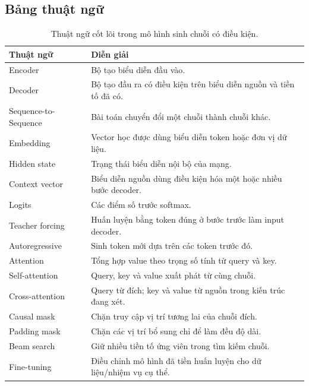 \documentclass[11pt,a4paper]{article}
\numberwithin{equation}{section}
\begin{document}
\subsection{Bảng thuật ngữ}
\begin{table}[H]
\centering\small
\begin{tabularx}{\linewidth}{@{}p{4.2cm}Y@{}}
\toprule{}Thuật ngữ & Diễn giải\\\midrule
Encoder & Bộ tạo biểu diễn đầu vào.\\
Decoder & Bộ tạo đầu ra có điều kiện trên biểu diễn nguồn và tiền tố đã có.\\
Sequence-to-Sequence & Bài toán chuyển đổi một chuỗi thành chuỗi khác.\\
Embedding & Vector học được dùng biểu diễn token hoặc đơn vị dữ liệu.\\
Hidden state & Trạng thái biểu diễn nội bộ của mạng.\\
Context vector & Biểu diễn nguồn dùng điều kiện hóa một hoặc nhiều bước decoder.\\
Logits & Các điểm số trước softmax.\\
Teacher forcing & Huấn luyện bằng token đúng ở bước trước làm input decoder.\\
Autoregressive & Sinh token mới dựa trên các token trước đó.\\
Attention & Tổng hợp value theo trọng số tính từ query và key.\\
Self-attention & Query, key và value xuất phát từ cùng chuỗi.\\
Cross-attention & Query từ đích; key và value từ nguồn trong kiến trúc đang xét.\\
Causal mask & Chặn truy cập vị trí tương lai của chuỗi đích.\\
Padding mask & Chặn các vị trí bổ sung chỉ để làm đều độ dài.\\
Beam search & Giữ nhiều tiền tố ứng viên trong tìm kiếm chuỗi.\\
Fine-tuning & Điều chỉnh mô hình đã tiền huấn luyện cho dữ liệu/nhiệm vụ cụ thể.\\
\bottomrule
\end{tabularx}
\caption{Thuật ngữ cốt lõi trong mô hình sinh chuỗi có điều kiện.}
\end{table}
\endgroup
\end{document}
